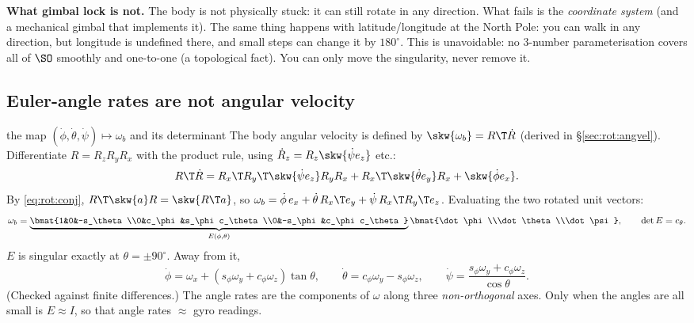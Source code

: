 \textbf{What gimbal lock is not.} The body is not physically stuck: it can still rotate in any direction. What fails is the \emph{coordinate system} (and a mechanical gimbal that implements it). The same thing happens with latitude/longitude at the North Pole: you can walk in any direction, but longitude is undefined there, and small steps can change it by $180^\circ$. This is unavoidable: no 3-number parameterisation covers all of $\SO$ smoothly and one-to-one (a topological fact). You can only move the singularity, never remove it.

\subsection{Euler-angle rates are not angular velocity}\label{sec:rot:euler-angle-rates}
\begin{deriv}{the map $(\dot\phi,\dot\theta,\dot\psi)\mapsto\omega_b$ and its determinant}
The body angular velocity is defined by $\skw{\omega_b}=R\T\dot R$ (derived in \S\ref{sec:rot:angvel}). Differentiate $R=R_zR_yR_x$ with the product rule, using $\dot R_z=R_z\skw{\dot\psi e_z}$ etc.:
\[
R\T\dot R = R_x\T R_y\T\skw{\dot\psi e_z}R_yR_x + R_x\T\skw{\dot\theta e_y}R_x + \skw{\dot\phi e_x}.
\]
By \eqref{eq:rot:conj}, $R\T\skw{a}R=\skw{R\T a}$, so
$\omega_b=\dot\phi\,e_x+\dot\theta\,R_x\T e_y+\dot\psi\,R_x\T R_y\T e_z$. Evaluating the two rotated unit vectors:
\[
\omega_b=\underbrace{\bmat{1&0&-s_\theta\\0&c_\phi&s_\phi c_\theta\\0&-s_\phi&c_\phi c_\theta}}_{E(\phi,\theta)}\bmat{\dot\phi\\\dot\theta\\\dot\psi},\qquad \det E=c_\theta .
\]
$E$ is singular exactly at $\theta=\pm90^\circ$. Away from it,
\[
\dot\phi=\omega_x+(s_\phi\omega_y+c_\phi\omega_z)\tan\theta,\qquad \dot\theta=c_\phi\omega_y-s_\phi\omega_z,\qquad \dot\psi=\frac{s_\phi\omega_y+c_\phi\omega_z}{\cos\theta}.
\]
(Checked against finite differences.) The angle rates are the components of $\omega$ along three \emph{non-orthogonal} axes. Only when the angles are all small is $E\approx I$, so that angle rates $\approx$ gyro readings.
\end{deriv}

